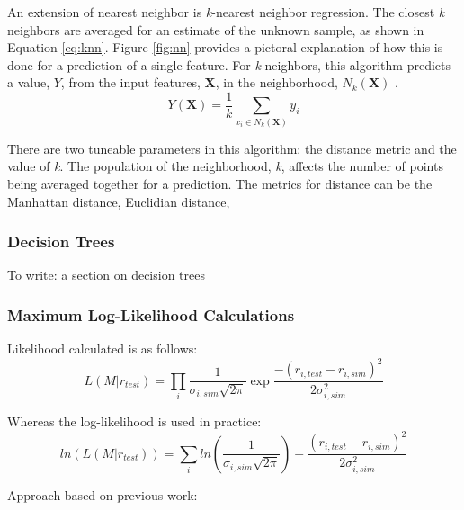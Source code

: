 An extension of nearest neighbor is \textit{k}-nearest neighbor regression.
The closest \textit{k} neighbors are averaged for an estimate of the unknown
sample, as shown in Equation \ref{eq:knn}.  Figure \ref{fig:nn} provides a
pictoral explanation of how this is done for a prediction of a single feature.
For \textit{k}-neighbors, this algorithm predicts a value, $Y$, from the input
features, $\boldsymbol{X}$, in the neighborhood, $N_k (\boldsymbol{X})$
\cite{elements_stats}. 
\begin{equation}
  Y(\boldsymbol{X}) = \frac{1}{k} \sum_{x_i \in N_k(\boldsymbol{X})} y_i
  \label{eq:knn}
\end{equation}

There are two tuneable parameters in this algorithm: the distance metric and
the value of \textit{k}.  The population of the neighborhood, \textit{k},
affects the number of points being averaged together for a prediction.  The
metrics for distance can be the Manhattan distance, Euclidian distance, 

\subsubsection{Decision Trees}
To write: a section on decision trees

\subsubsection{Maximum Log-Likelihood Calculations}

Likelihood calculated is as follows:
\[L(M|r_{test}) = \prod_i \frac{1}{\sigma_{i,sim} \sqrt{2\pi}} \exp{\frac{-(r_{i,test} - r_{i,sim})^2}{2 \sigma_{i,sim}^2}}\]

Whereas the log-likelihood is used in practice:
\[ln(L(M|r_{test})) = \sum_i ln(\frac{1}{\sigma_{i,sim} \sqrt{2\pi}}) - \frac{(r_{i,test} - r_{i,sim})^2}{2 \sigma_{i,sim}^2}\]

Approach based on previous work: \cite{mll_method, mll_validate, mll_sensitivity}
